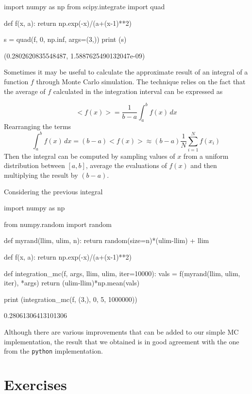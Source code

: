 \begin{ipython}
import numpy as np
from scipy.integrate import quad
	
def f(x, a):
    return np.exp(-x)/(a+(x-1)**2)
	
s = quad(f, 0, np.inf, args=(3,))
print (s)
\end{ipython}
\begin{ioutput}
(0.2802620835548487, 1.5887625490132047e-09)
\end{ioutput}

Sometimes it may be useful to calculate the approximate result of an integral of a function $f$ through Monte Carlo simulation. The technique relies on the fact that the average of $f$ calculated in the integration interval can be expressed as

\begin{equation}
<f(x)> = \frac{1}{b-a} \int_{a}^{b} f(x) \,dx
\end{equation}
Rearranging the terms
\begin{equation}
\int_{a}^{b} f(x) \,dx = 
(b-a) <f(x)> \approx (b-a) \frac{1}{N} \sum_{i=1}^{N} f(x_i)
\end{equation}
Then the integral can be computed by sampling values of $x$ from a uniform distribution between $[a,b]$, average the evaluations of $f(x)$ and then multiplying the result by $(b-a)$.

Considering the previous integral

\begin{ipython}
import numpy as np

from numpy.random import random

def myrand(llim, ulim, n):
    return random(size=n)*(ulim-llim) + llim

def f(x, a):
    return np.exp(-x)/(a+(x-1)**2)

def integration_mc(f, args, llim, ulim, iter=10000):
    vals = f(myrand(llim, ulim, iter), *args)
    return (ulim-llim)*np.mean(vals)

print (integration_mc(f, (3,), 0, 5, 1000000))
\end{ipython}
\begin{ioutput}
0.28061306413101306
\end{ioutput} 
 
Although there are various improvements that can be added to our simple MC implementation, the result that we obtained is in good agreement with the one from the \texttt{python} implementation.  
 
\section*{Exercises}


